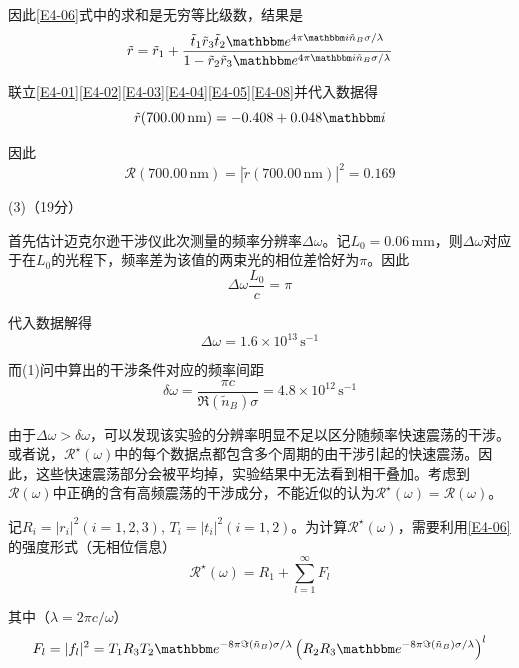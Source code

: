 \documentclass[10pt,a4paper,onecolumn,UTF8]{ctexart}
\begin{document}
	因此\eqref{E4-06}式中的求和是无穷等比级数，结果是
	\begin{equation}\label{E4-08}
		\tilde{r}=\tilde{r}_1+\frac{\tilde{t}_1\tilde{r}_3\tilde{t}_2\ue^{4\pi\ui\tilde{n}_B\sigma/\lambda}}{1-\tilde{r}_2\tilde{r}_3\ue^{4\pi\ui\tilde{n}_B\sigma/\lambda}}
	\end{equation}
	
	联立\eqref{E4-01}\eqref{E4-02}\eqref{E4-03}\eqref{E4-04}\eqref{E4-05}\eqref{E4-08}并代入数据得
	\begin{equation}
		\tilde{r}(700.00\,\text{nm})=-0.408+0.048\ui
	\end{equation}
	
	因此
	\begin{equation}
		\mathscr{R}(700.00\,\text{nm})=|\tilde{r}(700.00\,\text{nm})|^2=0.169
	\end{equation}
	
	(3)（19分）
	
	首先估计迈克尔逊干涉仪此次测量的频率分辨率$\Delta\omega$。记$L_0=0.06\,\text{mm}$，则$\Delta\omega$对应于在$L_0$的光程下，频率差为该值的两束光的相位差恰好为$\pi$。因此
	\begin{equation}
		\Delta\omega\frac{L_0}{c}=\pi
	\end{equation}
	
	代入数据解得
	\begin{equation}
		\Delta\omega=1.6\times10^{13}\,\text{s}^{-1}
	\end{equation}
	
	而(1)问中算出的干涉条件对应的频率间距
	\begin{equation}
		\delta\omega=\frac{\pi c}{\Re(\tilde{n}_B)\sigma}=4.8\times10^{12}\,\text{s}^{-1}
	\end{equation}
	
	由于$\Delta\omega>\delta\omega$，可以发现该实验的分辨率明显不足以区分随频率快速震荡的干涉。或者说，$\mathscr{R}^{\star}(\omega)$中的每个数据点都包含多个周期的由干涉引起的快速震荡。因此，这些快速震荡部分会被平均掉，实验结果中无法看到相干叠加。考虑到$\mathscr{R}(\omega)$中正确的含有高频震荡的干涉成分，不能近似的认为$\mathscr{R}^{\star}(\omega)=\mathscr{R}(\omega)$。
	
	记$R_i=|r_i|^2(i=1,2,3),\,T_i=|t_i|^2(i=1,2)$。为计算$\mathscr{R}^{\star}(\omega)$，需要利用\eqref{E4-06}的强度形式（无相位信息）
	\begin{equation}\label{E4-17}
		\mathscr{R}^{\star}(\omega)=R_1+\sum_{l=1}^{\infty}F_l
	\end{equation}
	
	其中（$\lambda=2\pi c/\omega$）
	\begin{equation}
		F_l=|f_l|^2=T_1R_3T_2\ue^{-8\pi\Im(\tilde{n}_B)\sigma/\lambda}\left(R_2R_3\ue^{-8\pi\Im(\tilde{n}_B)\sigma/\lambda}\right)^l
	\end{equation}
	
\end{document}
